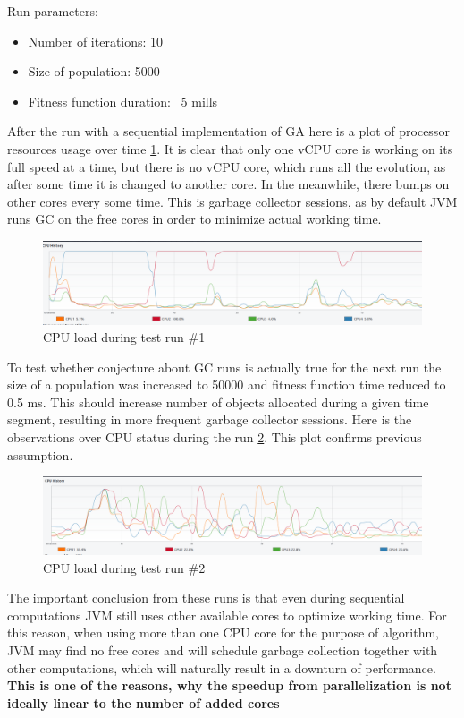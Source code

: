 Run parameters:
\begin{itemize}
\item Number of iterations: 10
\item Size of population: 5000
\item Fitness function duration: ~5 mills
\end{itemize}

After the run with a sequential implementation of GA here is a plot of processor resources usage over time \ref{img:cpu-run-1}. It is clear that only one vCPU core is working on its full speed at a time, but there is no vCPU core, which runs all the evolution, as after some time it is changed to another core. In the meanwhile, there bumps on other cores every some time. This is garbage collector sessions, as by default JVM runs GC on the free cores in order to minimize actual working time.

\begin{figure}[h]
\centering\includegraphics[width=1\textwidth]{img/exp/1/cpu-500}
\caption{CPU load during test run \#1}  \label{img:cpu-run-1}
\end{figure}

To test whether conjecture about GC runs is actually true for the next run the size of a population was increased to 50000 and fitness function time reduced to 0.5 ms. This should increase number of objects allocated during a given time segment, resulting in more frequent garbage collector sessions. Here is the observations over CPU status during the run \ref{img:cpu-run-2}. This plot confirms previous assumption.

\begin{figure}[h]
\centering\includegraphics[width=1\textwidth]{img/exp/1/cpu-5000}
\caption{CPU load during test run \#2}  \label{img:cpu-run-2}
\end{figure}

The important conclusion from these runs is that even during sequential computations JVM still uses other available cores to optimize working time. For this reason, when using more than one CPU core for the purpose of algorithm, JVM may find no free cores and will schedule garbage collection together with other computations, which will naturally result in a downturn of performance. \textbf{This is one of the reasons, why the speedup from parallelization is not ideally linear to the number of added cores}



